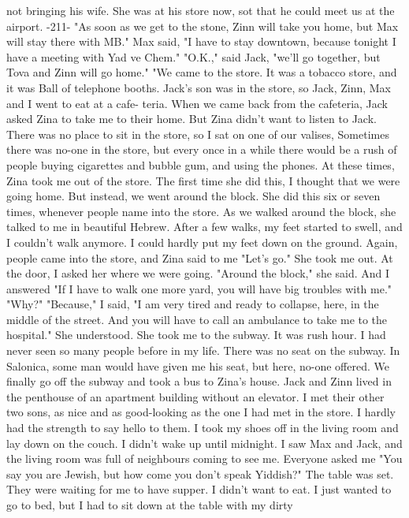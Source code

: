 not bringing his wife. She was at his store now, sot that he could meet
us at the airport. 
-211- 
"As soon as we get to the stone, Zinn will take you home, but Max will stay there 
with MB." 
Max said, "I have to stay downtown, because tonight I have a meeting with Yad ve 
Chem." 
"O.K.," said Jack, "we'll go together, but Tova and Zinn will go home." 
"We came to the store. It was a tobacco store, and it was Ball of telephone 
booths. Jack's son was in the store, so Jack, Zinn, Max and I went to eat at a cafe-
teria. When we came back from the cafeteria, Jack asked Zina to take me to their 
home. But Zina didn't want to listen to Jack. There was no place to sit in the store, 
so I sat on one of our valises, Sometimes there was no-one in the store, but every 
once in a while there would be a rush of people buying cigarettes and bubble gum, and 
using the phones. At these times, Zina took me out of the store. 
The first time she did this, I thought that we were going home. But instead, we 
went around the block. She did this six or seven times, whenever people name into the 
store. As we walked around the block, she talked to me in beautiful Hebrew. After a 
few walks, my feet started to swell, and I couldn't walk anymore. I could hardly 
put my feet down on the ground. Again, people came into the store, and Zina said to 
me "Let's go." 
She took me out. At the door, I asked her where we were going. "Around the 
block," she said. 
And I answered "If I have to walk one more yard, you will have big troubles with 
me." 
"Why?" 
"Because," I said, "I am very tired and ready to collapse, here, in the middle of 
the street. And you will have to call an ambulance to take me to the hospital." 
She understood. She took me to the subway. It was rush hour. I had never seen 
so many people before in my life. There was no seat on the subway. In Salonica, some 
man would have given me his seat, but here, no-one offered. We finally go off the 
subway and took a bus to Zina's house. 
Jack and Zinn lived in the penthouse of an apartment building without an elevator. I met their other two sons, as nice and as good-looking as the one I 
had met in the store. I hardly had the strength to say hello to them. I took my 
shoes off in the living room and lay down on the couch. I didn't wake up until midnight. 
I saw Max and Jack, and the living room was full of neighbours coming to
see me. Everyone asked me "You say you are Jewish, but how come you don't speak Yiddish?" The table was set. They were waiting for me to have supper. I didn't want to 
eat. I just wanted to go to bed, but I had to sit down at the table with my dirty
